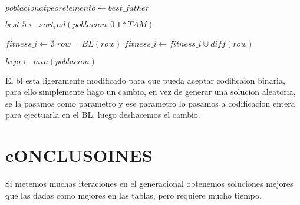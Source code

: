 \begin{algorithm}[H]
\begin{algorithmic}[1]
         
          \State $poblacion at peor elemento \gets best\_father$
        \EndIf

        \State $best\_5 \gets sort_ind(poblacion,0.1*TAM)$  
        
         
          \State $ fitness\_i \gets \emptyset$
            \State $row = BL(row)$ 
            \State $fitness\_i \gets fitness\_i \cup diff(row)$ 
          \EndFor
        \EndIf

      \EndWhile

      \State $hijo \gets min(poblacion)$
      
      \State {}
    \EndFunction
  \end{algorithmic}
\end{algorithm}

El bl esta ligeramente modificado para que pueda aceptar codificaion binaria, para ello simplemente hago un cambio, en vez 
de generar una solucion aleatoria, se la pasamos como parametro y ese parametro lo pasamos a codificacion entera para ejectuarla en el BL, luego deshacemos el cambio.

\section{cONCLUSOINES}

Si metemos muchas iteraciones en el generacional obtenemos soluciones mejores que las dadas como mejores en las tablas, pero
requiere mucho tiempo.\\

